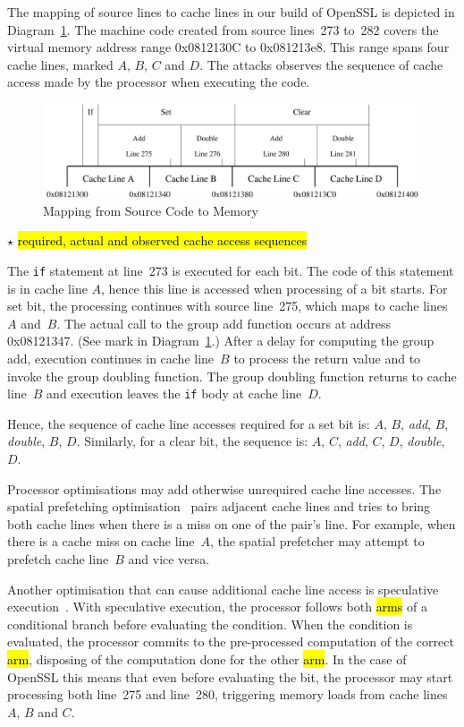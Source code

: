 \documentclass{llncs}
\newcommand{\starpar}[1]{\par{\footnotesize $\star$ \hl{#1}\par}}
\begin{document}
The mapping of source lines to cache lines in our build of OpenSSL is depicted in Diagram~\ref{dgm:memory}.
The machine code created from source lines~273 to~282 covers the virtual memory address range 0x0812130C
to 0x081213e8.
This range spans four cache lines, marked $A$, $B$, $C$ and $D$.
The attacks observes the sequence of cache access made by the processor when executing the code.


\begin{figure}[htb]
\centering\includegraphics[width=\columnwidth]{images/memory}
\caption{Mapping from Source Code to Memory\label{dgm:memory}}
\end{figure}


\starpar{required, actual and observed cache access sequences}

The \texttt{if} statement at line~273 is executed for each bit.  
The code of this statement is in cache line $A$, hence this line is accessed when processing of a bit starts.
For set bit, the processing continues with source line~275, which maps to cache lines~$A$ and~$B$.
The actual call to the group add function occurs at address 0x08121347.
(See mark in Diagram~\ref{dgm:memory}.)
After a delay for computing the group add, execution continues in cache line~$B$ to process the return value and 
to invoke the group doubling function.
The group doubling function returns to cache line~$B$ and execution leaves the \texttt{if} body at cache line~$D$.

Hence, the sequence of cache line accesses required for a set bit is: $A$, $B$, \textit{add}, $B$, \textit{double}, $B$, $D$.
Similarly, for a clear bit, the sequence is: $A$, $C$, \textit{add}, $C$, $D$, \textit{double}, $D$.

Processor optimisations may add otherwise unrequired cache line accesses.
The spatial prefetching optimisation~\cite{intel12optimization} pairs adjacent cache lines and tries to bring both cache lines
when there is a miss on one of the pair's line.
For example, when there is a cache miss on cache line~$A$, the spatial prefetcher may attempt to prefetch cache line~$B$
and vice versa.

Another optimisation that can cause additional cache line access is speculative execution~\cite{uht95disjoint}.
With speculative execution, the processor follows both \hl{arms} of a conditional branch before evaluating
the condition.
When the condition is evaluated, the processor commits to the pre-processed computation of the correct \hl{arm},
disposing of the computation done for the other \hl{arm}. 
In the case of OpenSSL this means that even before evaluating the bit, 
the processor may start processing both line~275 and line~280, triggering memory loads from cache lines~$A$, $B$ and $C$.
\end{document}
